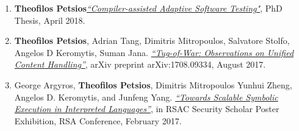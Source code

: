 \begin{cvparagraph}
\begin{enumerate}[label=O\arabic*]
    \item \textbf{Theofilos Petsios}\href{https://academiccommons.columbia.edu/doi/10.7916/D8M05NGN}{\textit{``Compiler-assisted Adaptive Software Testing"}}, PhD Thesis, April 2018.
    \item \textbf{Theofilos Petsios}, Adrian Tang, Dimitris Mitropoulos, Salvatore Stolfo, Angelos D Keromytis, Suman Jana. \href{https://arxiv.org/pdf/1708.09334.pdf}{\textit{``Tug-of-War: Observations on Unified Content Handling''}}, arXiv preprint arXiv:1708.09334, August 2017.
    \item George Argyros, \textbf{Theofilos Petsios}, Dimitris Mitropoulos
        Yunhui Zheng, Angelos D. Keromytis, and Junfeng Yang.
        \href{https://www.rsaconference.com/writable/files/About/towards_scalable_symbolic_execution_in_interpreted_languages.pdf}{\textit{``Towards Scalable Symbolic Execution in Interpreted Languages''}}, in RSAC Security Scholar Poster Exhibition, RSA Conference, February 2017.
        \label{itm:poster_arpegio}
\end{enumerate}
\end{cvparagraph}
